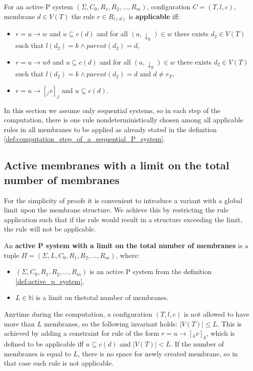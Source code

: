 \begin{definition}
  \label{def:applicable_rule_of_active_p_system}
  For an active P system $(\Sigma, C_0, R_1, R_2, \ldots , R_m)$, configuration $C = (T, l, c)$, membrane $d\in V(T)$ the rule $r\in R_{l(d)}$ is {\bf applicable} iff:
  \begin{itemize}
    \item $r = u\rightarrow w$ and $u\subseteq c(d)$ and for all $(a,\downarrow_k)\in w$ there exists $d_2\in V(T)$ such that $l(d_2)=k \wedge parent(d_2) = d$,
    \item $r = u\rightarrow w\delta$ and $u\subseteq c(d)$ and for all $(a,\downarrow_k)\in w$ there exists $d_2\in V(T)$ such that $l(d_2)=k \wedge parent(d_2) = d$ and $d\neq r_T$,
    \item $r = u\rightarrow [_j v]_j$ and $u\subseteq c(d)$.
  \end{itemize}
\end{definition}

In this section we assume only sequential systems, so in each step of the computation, there is one rule nondeterministically chosen among all applicable rules in all membranes to be applied as already stated in the definition \ref{def:computation_step_of_a_sequential_P_system}.


\subsection{Active membranes with a limit on the total number of membranes} %
\label{sub:active_membranes_with_a_limit_on_total_number_of_membranes}

For the simplicity of proofs it is convenient to introduce a variant with a global limit upon the membrane structure. We achieve this by restricting the rule application such that if the rule would result in a structure exceeding the limit, the rule will not be applicable.

\begin{definition}
  \label{def:active_p_system_with_a_limit_on_total_number_of_membranes}
  An {\bf active P system with a limit on the total number of membranes} is a tuple $\Pi = (\Sigma, L, C_0, R_1, R_2, \ldots , R_m)$, where:
  \begin{itemize}
    \item $(\Sigma, C_0, R_1, R_2, \ldots , R_m)$ is an active P system from the definition \ref{def:active_p_system},
    \item $L\in \mathbb N$ is a limit on thetotal number of membranes.
  \end{itemize}
\end{definition}
Anytime during the computation, a configuration $(T, l, c)$ is not allowed to have more than $L$ membranes, so the following invariant holds: $|V(T)|\leq L$.
This is achieved by adding a constraint for rule of the form $r = u\rightarrow [_k v]_k$, which is defined to be applicable iff $u\subseteq c(d)$ and $|V(T)|<L$. If the number of membranes is equal to $L$, there is no space for newly created membrane, so in that case such rule is not applicable.

